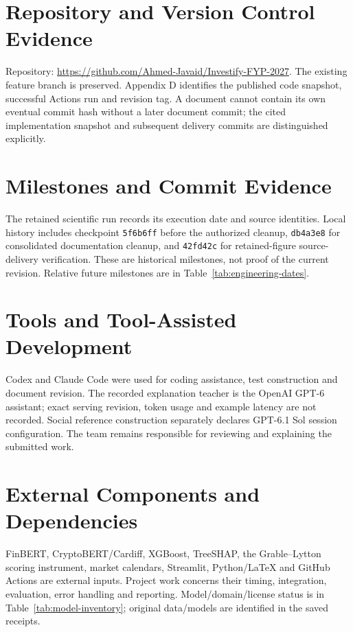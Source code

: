 \section{Repository and Version Control Evidence}
Repository: \url{https://github.com/Ahmed-Javaid/Investify-FYP-2027}. The existing feature branch is preserved. Appendix D identifies the published code snapshot, successful Actions run and revision tag. A document cannot contain its own eventual commit hash without a later document commit; the cited implementation snapshot and subsequent delivery commits are distinguished explicitly.
\section{Milestones and Commit Evidence}
The retained scientific run records its execution date and source identities. Local history includes checkpoint \texttt{5f6b6ff} before the authorized cleanup, \texttt{db4a3e8} for consolidated documentation cleanup, and \texttt{42fd42c} for retained-figure source-delivery verification. These are historical milestones, not proof of the current revision. Relative future milestones are in Table~\ref{tab:engineering-dates}.
\section{Tools and Tool-Assisted Development}
Codex and Claude Code were used for coding assistance, test construction and document revision. The recorded explanation teacher is the OpenAI GPT-6 assistant; exact serving revision, token usage and example latency are not recorded. Social reference construction separately declares GPT-6.1 Sol session configuration. The team remains responsible for reviewing and explaining the submitted work.
\section{External Components and Dependencies}
FinBERT, CryptoBERT/Cardiff, XGBoost, TreeSHAP, the Grable--Lytton scoring instrument, market calendars, Streamlit, Python/LaTeX and GitHub Actions are external inputs. Project work concerns their timing, integration, evaluation, error handling and reporting. Model/domain/license status is in Table~\ref{tab:model-inventory}; original data/models are identified in the saved receipts.
